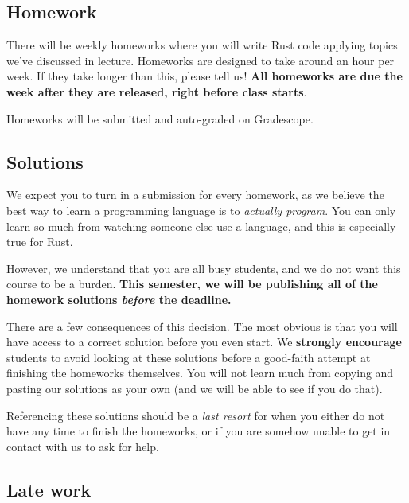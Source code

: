 \documentclass{article}
\begin{document}

\clearpage


\subsection*{Homework}

There will be weekly homeworks where you will write Rust code applying topics
we've discussed in lecture. Homeworks are designed to take around an hour per
week. If they take longer than this, please tell us! \textbf{All homeworks are
due the week after they are released, right before class starts}.

Homeworks will be submitted and auto-graded on Gradescope.

\subsection*{Solutions}

We expect you to turn in a submission for every homework, as we believe the
best way to learn a programming language is to \textit{actually program}.
You can only learn so much from watching someone else use a language, and this
is especially true for Rust.

However, we understand that you are all busy students, and we do not want this
course to be a burden. \textbf{This semester, we will be publishing all of the
homework solutions \textit{before} the deadline.}

There are a few consequences of this decision. The most obvious is that you will
have access to a correct solution before you even start. We \textbf{strongly
encourage} students to avoid looking at these solutions before a good-faith
attempt at finishing the homeworks themselves. You will not learn much from
copying and pasting our solutions as your own (and we will be able to see if
you do that).

Referencing these solutions should be a \textit{last resort} for when you either
do not have any time to finish the homeworks, or if you are somehow unable to
get in contact with us to ask for help.


\subsection*{Late work}
\end{document}

